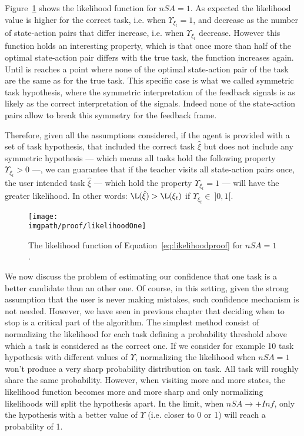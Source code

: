 Figure~\ref{fig:prooflikelihoodone} shows the likelihood function for $nSA = 1$. As expected the likelihood value is higher for the correct task, i.e. when $\Upsilon_{\xi_t} = 1$, and decrease as the number of state-action pairs that differ increase, i.e. when $\Upsilon_{\xi_t}$ decrease. However this function holds an interesting property, which is that once more than half of the optimal state-action pair differs with the true task, the function increases again. Until is reaches a point where none of the optimal state-action pair of the task are the same as for the true task. This specific case is what we called symmetric task hypothesis, where the symmetric interpretation of the feedback signals is as likely as  the correct interpretation of the signals. Indeed none of the state-action pairs allow to break this symmetry for the feedback frame. 

Therefore, given all the assumptions considered, if the agent is provided with a set of task hypothesis, that included the correct task $\hat{\xi}$ but does not include any symmetric hypothesis --- which means all tasks hold the following property $\Upsilon_{\xi_t} > 0$ ---, we can guarantee that if the teacher visits all state-action pairs once, the user intended task $\hat{\xi}$ --- which hold the property $\Upsilon_{\xi_t} = 1$ --- will have the greater likelihood. In other words: $\L(\hat{\xi}) > \L(\xi_t)$ if $\Upsilon_{\xi_t} \in~]0,1[$.

\begin{figure}[!ht]
\centering
\texttt{[image: \\imgpath/proof/likelihoodOne]}
\caption{The likelihood function of Equation~\ref{eq:likelihoodproof} for $nSA =1$.}
\label{fig:prooflikelihoodone}
\end{figure}

We now discuss the problem of estimating our confidence that one task is a better candidate than an other one. Of course, in this setting, given the strong assumption that the user is never making mistakes, such confidence mechanism is not needed. However, we have seen in previous chapter that deciding when to stop is a critical part of the algorithm. The simplest method consist of normalizing the likelihood for each task defining a probability threshold above which a task is considered as the correct one. If we consider for example 10 task hypothesis with different values of $\Upsilon$, normalizing the likelihood when $nSA = 1$ won't produce a very sharp probability distribution on task. All task will roughly share the same probability. However, when visiting more and more states, the likelihood function becomes more and more sharp and only normalizing likelihoods will split the hypothesis apart. In the limit, when $nSA \rightarrow +Inf$, only the hypothesis with a better value of $\Upsilon$ (i.e. closer to 0 or 1) will reach a probability of 1.

